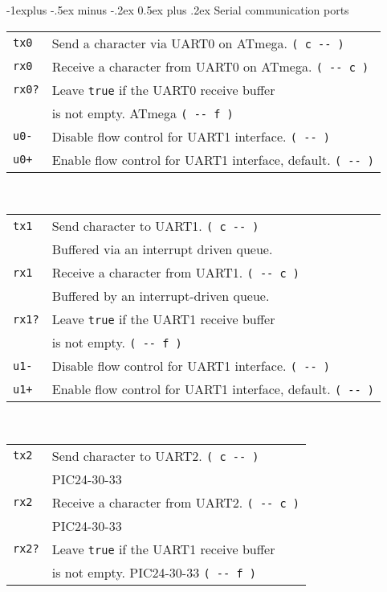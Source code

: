 \documentclass[10pt,landscape,a4paper]{article}
\makeatletter
\renewcommand{\subsection}{\@startsection{subsection}{2}{0mm}%
                                {-1explus -.5ex minus -.2ex}%
                                {0.5ex plus .2ex}%
                                {\normalfont\normalsize\bfseries}}
\makeatother
\begin{document}
\begin{multicols}{3}
\medskip

\subsection{Serial communication ports}
\begin{tabular}{@{}ll@{}}
\verb!tx0!  & Send a character via UART0 on ATmega. \verb!( c -- )! \\
\verb!rx0!  & Receive a character from UART0 on ATmega. \verb!( -- c )! \\
\verb!rx0?!  & Leave \verb!true! if the UART0 receive buffer \\
             & is not empty. ATmega \verb!( -- f )! \\
\verb!u0-!  & Disable flow control for UART1 interface. \verb!( -- )! \\
\verb!u0+!  & Enable flow control for UART1 interface, default. \verb!( -- )! \\
\end{tabular}\\
\begin{tabular}{@{}ll@{}}
\verb!tx1!  & Send character to UART1. \verb!( c -- )! \\
            & Buffered via an interrupt driven queue. \\
\verb!rx1!  & Receive a character from UART1. \verb!( -- c )! \\
            & Buffered by an interrupt-driven queue. \\
\verb!rx1?!  & Leave \verb!true! if the UART1 receive buffer \\
             & is not empty. \verb!( -- f )! \\
\verb!u1-!  & Disable flow control for UART1 interface. \verb!( -- )! \\
\verb!u1+!  & Enable flow control for UART1 interface, default. \verb!( -- )! \\
\end{tabular}\\
\begin{tabular}{@{}ll@{}}
\verb!tx2!  & Send character to UART2. \verb!( c -- )! \\
            & PIC24-30-33 \\
\verb!rx2!  & Receive a character from UART2. \verb!( -- c )! \\
            & PIC24-30-33 \\
\verb!rx2?!  & Leave \verb!true! if the UART1 receive buffer \\
             & is not empty. PIC24-30-33 \verb!( -- f )! \\

\end{tabular}
\end{multicols}
\end{document}
